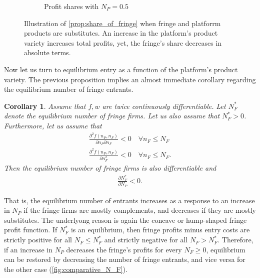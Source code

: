 \documentclass[a4paper]{article}
\newtheorem{corollary}{Corollary}
\begin{document}
\begin{figure}[ht]
\begin{subfigure}[b]{0.45\textwidth}
        \caption{Profit shares with $N_P = 0.5$}
    \end{subfigure}
    \caption{Illustration of \cref{prop:share_of_fringe} when fringe and platforrm products are substitutes. An increase in the platform's product variety increases total profits, yet, the fringe's share decreases in absolute terms.}
    \label{fig:increase_N_P_fringe}
\end{figure}

Now let us turn to equilibrium entry as a function of the platform's product variety.
The previous proposition implies an almost immediate corollary regarding the equilibrium number of fringe entrants.
\begin{corollary}
    \label{cor:fringe_entry}
    Assume that $f, w$ are twice continuously differentiable.
    Let $N_F^*$ denote the equilibrium number of fringe firms.
    Let us also assume that $N_F^* > 0$.
    Furthermore, let us assume that
    \begin{align*}
        \frac{\partial^2 f(n_P, n_F)}{\partial n_P \partial n_F} < 0 \quad \forall n_F \leq N_F \\
        \frac{\partial^2 f(n_P, n_F)}{\partial n_F^2} < 0 \quad \forall n_F \leq N_F.
    \end{align*}
    Then the equilibrium number of fringe firms is also differentiable and
    \begin{align*}
        \frac{\partial N_F^*}{\partial N_P} < 0.
    \end{align*}
\end{corollary}
That is, the equilibrium number of entrants increases as a response to an increase in $N_P$ if the fringe firms are mostly complements, and decreases if they are mostly substitutes.
The underlyong reason is again the concave or hump-shaped fringe profit function.
If $N_F^*$ is an equilibrium, then fringe profits minus entry costs are strictly positive for all $N_F \leq N_F^*$ and strictly negative for all $N_F > N_F^*$.
Therefore, if an increase in $N_P$ decreases the fringe's profits for every $N_F \geq 0$, equilibrium can be restored by decreasing the number of fringe entrants, and vice versa for the other case (\cref{fig:comparative_N_F}).
\end{document}
